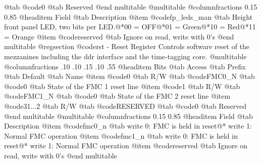 @tab @code{0} @tab 
Reserved
@end multitable
@multitable @columnfractions 0.15 0.85
@headitem Field @tab Description
@item @code{fp_leds_man} @tab Height front panel LED, two bits per LED.@*00 = OFF@*01 = Green@*10 = Red@*11 = Orange
@item @code{reserved} @tab Ignore on read, write with 0's
@end multitable
@regsection @code{rst} - Reset Register
Controls software reset of the mezzanines including the ddr interface and the time-tagging core.
@multitable @columnfractions .10 .10 .15 .10 .55
@headitem Bits @tab Access @tab Prefix @tab Default @tab Name
@item @code{0}
@tab R/W @tab
@code{FMC0_N}
@tab @code{0} @tab 
State of the FMC 1 reset line
@item @code{1}
@tab R/W @tab
@code{FMC1_N}
@tab @code{0} @tab 
State of the FMC 2 reset line
@item @code{31...2}
@tab R/W @tab
@code{RESERVED}
@tab @code{0} @tab 
Reserved
@end multitable
@multitable @columnfractions 0.15 0.85
@headitem Field @tab Description
@item @code{fmc0_n} @tab write 0: FMC is held in reset@* write 1: Normal FMC operation
@item @code{fmc1_n} @tab write 0: FMC is held in reset@* write 1: Normal FMC operation
@item @code{reserved} @tab Ignore on read, write with 0's
@end multitable
